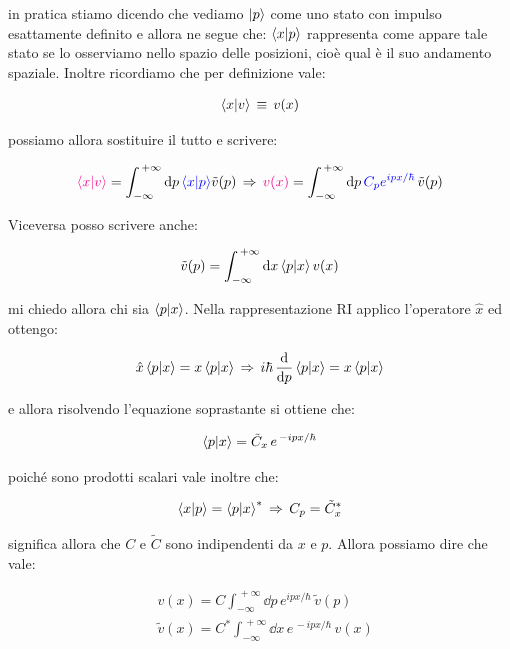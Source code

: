 	in pratica stiamo dicendo che vediamo $\ket{p}$ come uno stato con impulso esattamente definito e allora ne segue che: $\braket{x}{p}$ rappresenta come appare tale stato se lo osserviamo nello spazio delle posizioni, cioè qual è il suo andamento spaziale. Inoltre ricordiamo che per definizione vale:
	
\begin{align*}
	\braket{x}{v} \, \equiv \, v(x)
\end{align*}

	possiamo allora sostituire il tutto e scrivere:
	
\begin{align*}
	\textcolor{Magenta}{\braket{x}{v} }= \int_{-\infty}^{\, +\infty} \dd p \, \textcolor{blue}{\braket{x}{p}} \tilde{v}(p) \, \Rightarrow \, \textcolor{Magenta}{v(x)} = \int_{-\infty}^{\, +\infty} \dd p  \, \textcolor{blue}{C_p e^{ipx/\hbar} }\, \tilde{v}(p)
\end{align*}

	Viceversa posso scrivere anche:
	
\begin{align*}
	\tilde{v}(p) = \int_{-\infty}^{\, +\infty} \dd x \braket{p}{x} v(x)
\end{align*}
	
	mi chiedo allora chi sia $\braket{p}{x}$. Nella rappresentazione RI applico l'operatore $\hat{x}$ ed ottengo:
	
\begin{align*}
	\hat{x} \braket{p}{x} = x \braket{p}{x} \, \Rightarrow \, i\hbar \, \dv{p} \braket{p}{x} = x \braket{p}{x}
\end{align*}

	e allora risolvendo l'equazione soprastante si ottiene che:
	
\begin{align*}
	\braket{p}{x} = \tilde{C}_x \, e^{\, -i px / \hbar}
\end{align*}

	poiché sono prodotti scalari vale inoltre che:
	
\begin{align*}
	\braket{x}{p} = \braket{p}{x} ^* \, \Rightarrow \, C_p = \tilde{C}_x^*
\end{align*}

	significa allora che $C$ e $\tilde{C}$ sono indipendenti da $x$ e $p$. Allora possiamo dire che vale:

\begin{nb}
\begin{align*}
	& v(x) = C \int_{-\infty}^{\, +\infty} \dd p  \, e^{ipx/\hbar} \, \tilde{v}(p) \\
	& \tilde{v}(x) = C^* \int_{-\infty}^{\, +\infty} \dd x  \, e^{\, -ipx/\hbar} \, v(x)
\end{align*}
\end{nb}

